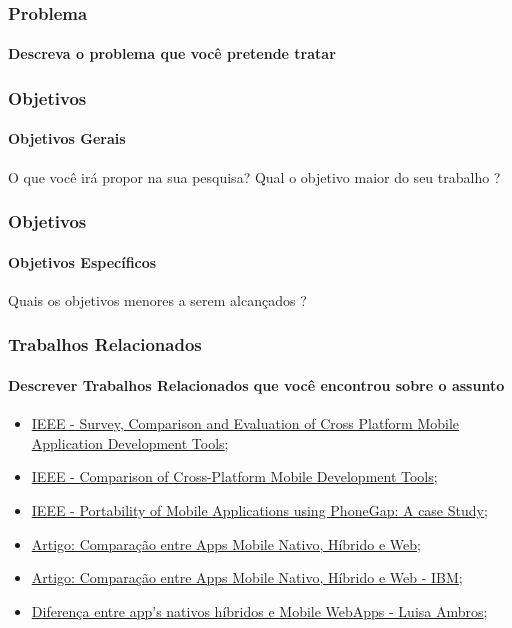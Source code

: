 \documentclass{beamer}
\begin{document}
\begin{frame}
	\frametitle{Problema}
	\framesubtitle{Descreva o problema que você pretende tratar}
	
\end{frame}

\begin{frame}
	\frametitle{Objetivos}
	\framesubtitle{Objetivos Gerais}
	O que você irá propor na sua pesquisa? Qual o objetivo maior do seu trabalho ?
\end{frame}

\begin{frame}
	\frametitle{Objetivos}
	\framesubtitle{Objetivos Específicos}
	Quais os objetivos menores a serem alcançados ?
\end{frame}

\begin{frame}[t]
	\frametitle{Trabalhos Relacionados}
	\framesubtitle{Descrever Trabalhos Relacionados que você encontrou sobre o assunto}
	\begin{itemize}
			\item \href{http://ieeexplore.ieee.org/stamp/stamp.jsp?arnumber=6583580} {IEEE - Survey, Comparison and Evaluation of Cross Platform Mobile Application Development Tools};		
			\item \href {http://ieeexplore.ieee.org/stamp/stamp.jsp?arnumber=6376023}{IEEE - Comparison of Cross-Platform Mobile Development Tools};
			\item \href{http://ieeexplore.ieee.org/stamp/stamp.jsp?arnumber=6549324}{IEEE - Portability of Mobile Applications using PhoneGap: A case Study};
			\item \href{http://www.nngroup.com/articles/mobile-native-apps/}{Artigo: Comparação entre Apps Mobile Nativo, Híbrido e Web};
			\item \href{https://www.ibm.com/developerworks/community/blogs/ctaurion/entry/desenvolvimento_de_apps-parte_2_hibrido_nativo_ou_web?lang=en}{Artigo: Comparação entre Apps Mobile Nativo, Híbrido e Web - IBM};
			\item \href{http://luisaambros.com/blog/diferenca-entre-aplicativos-nativos-hibridos-e-mobile-web-apps/}{Diferença entre app's nativos híbridos e Mobile WebApps - Luisa Ambros}; 
		\end{itemize}	
\end{frame}
\end{document}
